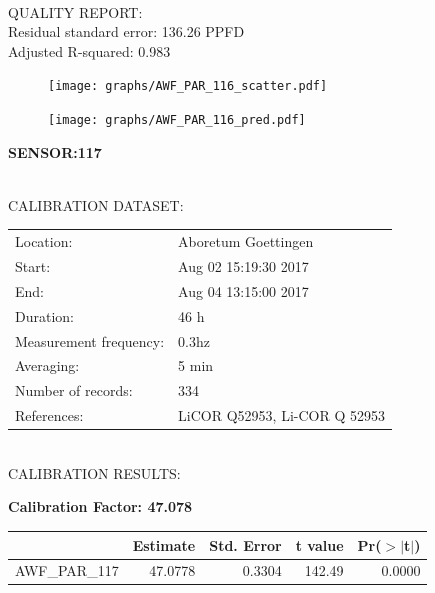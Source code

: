 \documentclass[oneside]{report}
\begin{document}
\hrulefill\\
QUALITY REPORT:\\
Residual standard error: 136.26 PPFD\\
Adjusted R-squared: 0.983



\begin{figure}[H]
  \centering
  \texttt{[image: graphs/AWF\_PAR\_116\_scatter.pdf]}
\end{figure}




\begin{figure}[H]
  \centering
  \texttt{[image: graphs/AWF\_PAR\_116\_pred.pdf]}
\end{figure}

\pagebreak


\begin{center}
\large{\textbf{SENSOR:117}}\\
\end{center}

\hrulefill\\
CALIBRATION DATASET:\\
\begin{table}[h!]
  \centering
  \label{tab:table1}
  \begin{tabular}{ll}
    Location: & Aboretum Goettingen\\ 
    
    
    Start:  & Aug 02 15:19:30 2017 \\
    End:   & Aug 04 13:15:00 2017\\ 
    Duration: & 46 h\\
    Measurement frequency: & 0.3hz\\
    Averaging:  &5 min\\
    Number of records: & 334 \\
    References: & LiCOR Q52953, Li-COR Q 52953 \\
  \end{tabular}
\end{table}

\hrulefill\\
CALIBRATION RESULTS:\\


\begin{center}
\textbf{\large{Calibration Factor: 47.078}}\\
\end{center}
\begin{table}[ht]
\centering
\begin{tabular}{rrrrr}
  \hline
 & Estimate & Std. Error & t value & Pr($>$$|$t$|$) \\ 
  \hline
AWF\_PAR\_117 & 47.0778 & 0.3304 & 142.49 & 0.0000 \\ 
   \hline
\end{tabular}
\end{table}
\end{document}
